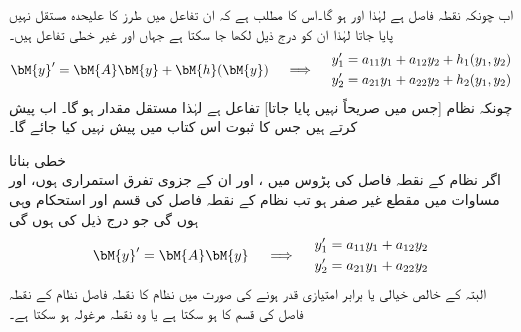 اب چونکہ  نقطہ فاصل ہے لہٰذا اور    ہو گا۔اس کا مطلب ہے کہ ان تفاعل میں  طرز کا علیحدہ مستقل نہیں پایا جاتا لہٰذا ان کو درج ذیل لکھا جا سکتا ہے جہاں  اور  غیر خطی تفاعل ہیں۔
\begin{gather}\label{مساوات_نظام_غیر_خطی_ترکیب_مرحلہ_ب}
\begin{aligned}
\bM{y}'=\bM{A}\bM{y}+\bM{h}(\bM{y})
\end{aligned} \quad \implies \quad 
\begin{aligned}
y_1'&=a_{11}y_1+a_{12}y_2+h_1(y_1,y_2)\\
y_2'&=a_{21}y_1+a_{22}y_2+h_2(y_1,y_2)
\end{aligned}
\end{gather}
چونکہ نظام   [جس میں  صریحاً نہیں پایا جاتا] تفاعل ہے لہٰذا  مستقل مقدار ہو گا۔ اب  پیش کرتے ہیں جس کا ثبوت اس کتاب میں پیش نہیں کیا جائے گا۔

\quad خطی بنانا\\
اگر نظام  کے نقطہ فاصل  کی پڑوس میں  ،  اور ان کے جزوی تفرق استمراری ہوں، اور  مساوات  میں مقطع  غیر صفر  ہو تب نظام  کے نقطہ فاصل کی قسم اور استحکام وہی ہوں گی جو درج ذیل  کی ہوں گی
\begin{gather}\label{مساوات_نظام_غیر_خطی_ترکیب_مرحلہ_پ}
\begin{aligned}
\bM{y}'=\bM{A}\bM{y}
\end{aligned} \quad \implies \quad 
\begin{aligned}
y_1'&=a_{11}y_1+a_{12}y_2\\
y_2'&=a_{21}y_1+a_{22}y_2
\end{aligned}
\end{gather}
البتہ  کے خالص خیالی یا برابر امتیازی قدر ہونے کی صورت میں نظام  کا نقطہ فاصل نظام  کے نقطہ فاصل کی قسم کا ہو سکتا ہے یا وہ نقطہ مرغولہ ہو سکتا ہے۔ 

